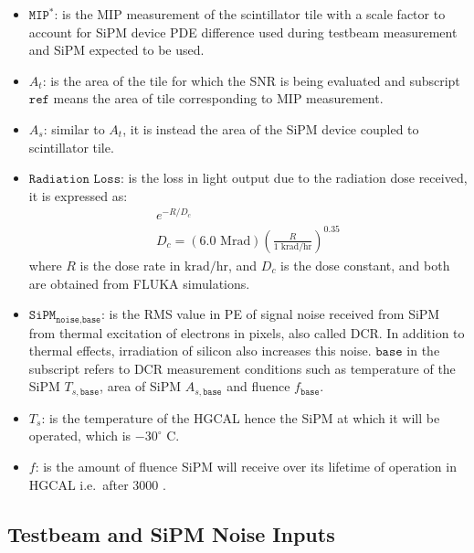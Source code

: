 \begin{itemize}
  \item \( \texttt{MIP}^{*} \): is the \gls{MIP} measurement of the
        scintillator tile with a scale factor to account for \gls{SiPM} device
        \gls{PDE} difference used during testbeam measurement and
        \gls{SiPM} expected to be used.
  \item \( A_t \): is the area of the tile for which the \gls{SNR} is being
        evaluated and subscript \( \texttt{ref} \) means the area of tile
        corresponding to \gls{MIP} measurement.
  \item \( A_s \): similar to \( A_t \), it is instead the area of the
        \gls{SiPM} device coupled to scintillator tile.
  \item \( \texttt{Radiation Loss} \): is the loss in light output
        due to the radiation dose received, it is expressed as:
        \begin{gather}
          e^{-R/D_{c}} \\
          D_c = (6.0 \text{ Mrad})
          {\left( \frac{R}{1 \xspace\text{ krad/hr}} \right)}^{0.35}
        \end{gather}
        where \( R \) is the dose rate in \( \text{krad/hr} \), and \( D_c \) is the
        dose constant, and both are obtained from \textsc{FLUKA} simulations.
  \item \( \texttt{SiPM}_\texttt{noise,base} \):
        is the \gls{RMS} value in \gls{PE} of
        signal noise received from \gls{SiPM} from thermal excitation
        of electrons in pixels, also called \gls{DCR}.
        In addition to thermal effects, irradiation of silicon
        also increases this noise. \( \texttt{base} \)
        in the subscript refers to \gls{DCR} measurement conditions such as
        temperature of the \gls{SiPM} \( T_{s,\texttt{base}}\),
        area of \gls{SiPM} \( A_{s,\texttt{base}}\) and fluence \( f_{\texttt{base}}\).
  \item \( T_s \): is the temperature of the \gls{HGCAL} hence the \gls{SiPM}
        at which it will be operated, which is \( -30^\circ \text{ C} \).
  \item \( f \): is the amount of fluence \gls{SiPM} will receive over its
        lifetime of operation in \gls{HGCAL} i.e.~after 3000 \fbinv{}.
\end{itemize}

\subsection{
  Testbeam and SiPM Noise Inputs
}


